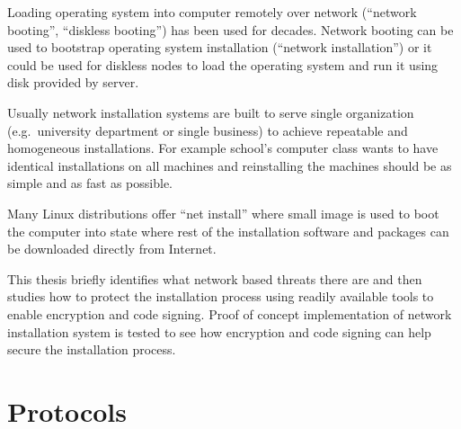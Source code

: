
\iffalse
FIXME: TODO REMOVE THIS LIST
\begin{itemize}
\item INTRODUCTION: The Setting - bird eye's view - the challenge to be tackled / thing to be be improved in general
\item INTRODUCTION: Past research done
\item INTRODUCTION: Gap in knowledge/problem not yet solved
\item INTRODUCTION: Purpose and method of this work
\item INTRODUCTION: More detailed description what was done
\item INTRODUCTION: Results acquired
\item INTRODUCTION: Analysis and limitations of the result (Mostly relocate to Conclusions)
\item INTRODUCTION: Value (Mostly relocate to Conclusions)
\end{itemize}
\fi

Loading operating system into computer remotely over network
(``network booting'', ``diskless booting'') has been used for
decades. Network booting can be used to bootstrap operating system
installation (``network installation'') or it could be used for
diskless nodes to load the operating system and run it using disk
provided by server.

Usually network installation systems are built to serve single
organization (e.g.\ university department or single business) to
achieve repeatable and homogeneous installations. For example school's
computer class wants to have identical installations on all machines
and reinstalling the machines should be as simple and as fast as
possible.

Many Linux distributions offer ``net install'' where small image is
used to boot the computer into state where rest of the installation
software and packages can be downloaded directly from Internet.

This thesis briefly identifies what network based threats there are
and then studies how to protect the installation process using readily
available tools to enable encryption and code signing. Proof of
concept implementation of network installation system is tested to see
how encryption and code signing can help secure the installation
process.

\section{Protocols}

